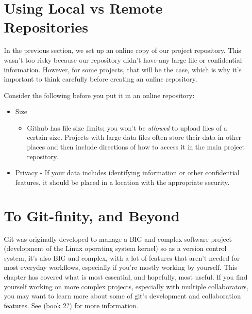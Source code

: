 \documentclass[]{Nemilov}
\providecommand{\tightlist}{%
  \setlength{\itemsep}{0pt}\setlength{\parskip}{0pt}}
\begin{document}
\hypertarget{py-version-control-local-vs-remote}{%
\section{Using Local vs Remote Repositories}\label{py-version-control-local-vs-remote}}

In the previous section, we set up an online copy of our project repository.
This wasn't too risky because our repository didn't have any large file or
confidential information. However, for some projects, that will be the case,
which is why it's important to think carefully before creating an online
repository.

Consider the following before you put it in an online repository:

\begin{itemize}
\tightlist
\item
  Size

  \begin{itemize}
  \tightlist
  \item
    Github has file size limits; you won't be \emph{allowed} to upload files of
    a certain size. Projects with large data files often store their data in
    other places and then include directions of how to access it in the main
    project repository.
  \end{itemize}
\item
  Privacy
  - If your data includes identifying information or other confidential
  features, it should be placed in a location with the appropriate security.
\end{itemize}

\hypertarget{py-version-control-beyond}{%
\section{To Git-finity, and Beyond}\label{py-version-control-beyond}}

Git was originally developed to manage a BIG and complex software project (development of the Linux operating system kernel) so as a version control system, it's also BIG and complex, with a lot of features that aren't needed for most everyday workflows, especially if you're mostly working by yourself. This chapter has covered what is most essential, and hopefully, most useful. If you find yourself working on more complex projects, especially with multiple collaborators, you may want to learn more about some of git's development and collaboration features. See (book 2?) for more information.
\end{document}
